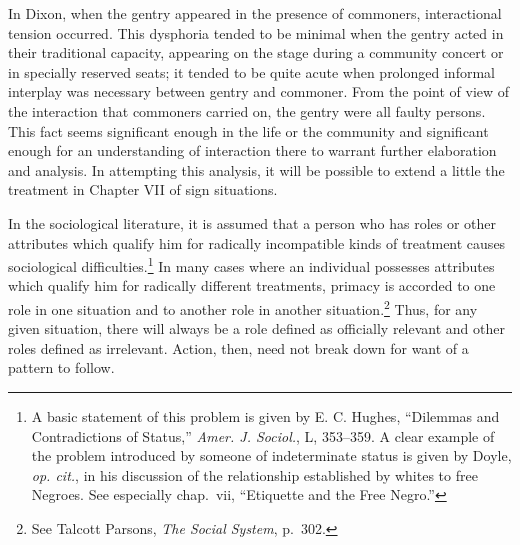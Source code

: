 \documentclass[openany,nobib]{tufte-book}
\begin{document}
\noindent In Dixon, when the gentry appeared in the presence of commoners,
interactional tension occurred. This dysphoria tended to be minimal when
the gentry acted in their traditional capacity, appearing on the stage
during a community concert or in specially reserved seats; it tended to
be quite acute when prolonged informal interplay was necessary between
gentry and commoner. From the point of view of the interaction that
commoners carried on, the gentry were all faulty persons. This fact
seems significant enough in the life or the community and significant
enough for an understanding of interaction there to warrant further
elaboration and analysis. In attempting this analysis, it will be
possible to extend a little the treatment in Chapter VII of sign
situations.

In the sociological literature, it is assumed that a person who has
roles or other attributes which qualify him for radically incompatible
kinds of treatment causes sociological difficulties.\footnote{A basic
  statement of this problem is given by E. C. Hughes, ``Dilemmas and
  Contradictions of Status,'' \emph{Amer. J. Sociol.}, L, 353--359. A
  clear example of the problem introduced by someone of indeterminate
  status is given by Doyle, \emph{op. cit.}, in his discussion of the
  relationship established by whites to free Negroes. See especially
  chap.~vii, ``Etiquette and the Free Negro.''} In many cases where an
individual possesses attributes which qualify him for radically
different treatments, primacy is accorded to one role in one situation
and to another role in another situation.\footnote{See Talcott Parsons,
  \emph{The Social System}, p.~302.} Thus, for any given situation,
there will always be a role defined as officially relevant and other
roles defined as irrelevant. Action, then, need not break down for want
of a pattern to follow.

\enlargethispage{\baselineskip}
\end{document}
